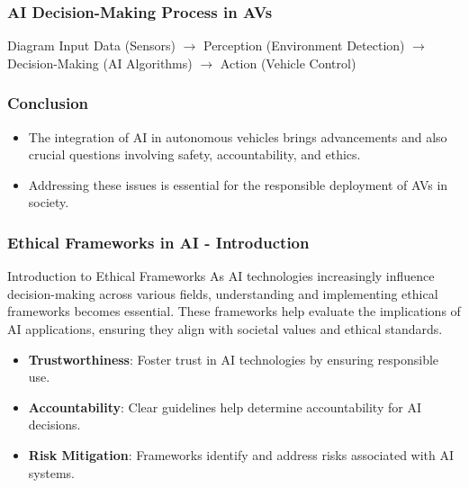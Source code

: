 \documentclass[aspectratio=169]{beamer}
\begin{document}
\begin{frame}[fragile]
    \frametitle{AI Decision-Making Process in AVs}
    \begin{block}{Diagram}
        Input Data (Sensors) $\rightarrow$ Perception (Environment Detection) $\rightarrow$ Decision-Making (AI Algorithms) $\rightarrow$ Action (Vehicle Control)
    \end{block}
\end{frame}

\begin{frame}[fragile]
    \frametitle{Conclusion}
    \begin{itemize}
        \item The integration of AI in autonomous vehicles brings advancements and also crucial questions involving safety, accountability, and ethics.
        \item Addressing these issues is essential for the responsible deployment of AVs in society.
    \end{itemize}
\end{frame}

\begin{frame}[fragile]
    \frametitle{Ethical Frameworks in AI - Introduction}
    \begin{block}{Introduction to Ethical Frameworks}
        As AI technologies increasingly influence decision-making across various fields, understanding and implementing ethical frameworks becomes essential. These frameworks help evaluate the implications of AI applications, ensuring they align with societal values and ethical standards.
    \end{block}
    
    \begin{itemize}
        \item \textbf{Trustworthiness}: Foster trust in AI technologies by ensuring responsible use.
        \item \textbf{Accountability}: Clear guidelines help determine accountability for AI decisions.
        \item \textbf{Risk Mitigation}: Frameworks identify and address risks associated with AI systems.
    \end{itemize}
\end{frame}
\end{document}
